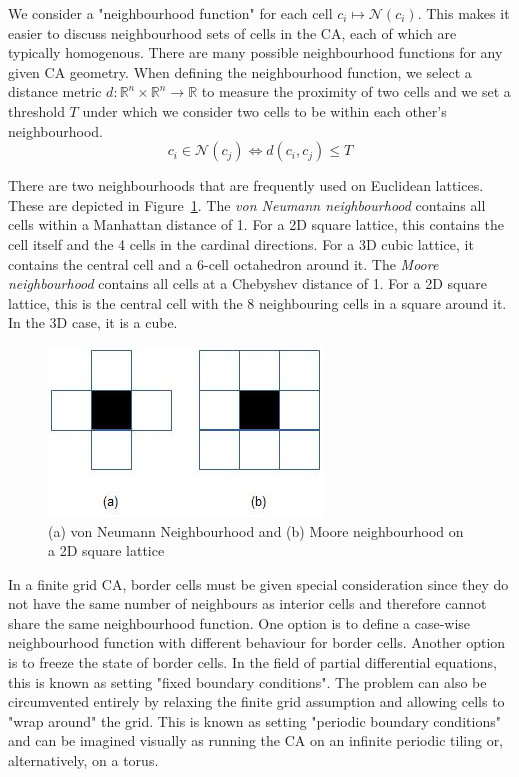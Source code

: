 We consider a "neighbourhood function" for each cell $c_i \mapsto \mathcal{N}(c_i)$. This makes it easier to discuss neighbourhood sets of cells in the CA, each of which are typically homogenous. There are many possible neighbourhood functions for any given CA geometry. When defining the neighbourhood function, we select a distance metric $d:\mathbb{R}^n \times \mathbb{R}^n \to \mathbb{R}$ to measure the proximity of two cells and we set a threshold $T$ under which we consider two cells to be within each other's neighbourhood.
\begin{equation}
  c_i \in \mathcal{N}(c_j) \iff d(c_i, c_j) \leq T
\end{equation}

There are two neighbourhoods that are frequently used on Euclidean lattices. These are depicted in Figure~\ref{fig:neighbourhoods}. The \textit{von Neumann neighbourhood} contains all cells within a Manhattan distance of 1. For a 2D square lattice, this contains the cell itself and the 4 cells in the cardinal directions. For a 3D cubic lattice, it contains the central cell and a 6-cell octahedron around it. The \textit{Moore neighbourhood} contains all cells at a Chebyshev distance of 1. For a 2D square lattice, this is the central cell with the 8 neighbouring cells in a square around it. In the 3D case, it is a cube.\\

\begin{figure}[!h]
\centering
\includegraphics[width=.3\textwidth]{images/neighbourhoods.png}
\caption{(a) von Neumann Neighbourhood and (b) Moore neighbourhood on a 2D square lattice \cite{debasis2011survey}}
\label{fig:neighbourhoods}
\end{figure}

In a finite grid CA, border cells must be given special consideration since they do not have the same number of neighbours as interior cells and therefore cannot share the same neighbourhood function. One option is to define a case-wise neighbourhood function with different behaviour for border cells. Another option is to freeze the state of border cells. In the field of partial differential equations, this is known as setting "fixed boundary conditions".  The problem can also be circumvented entirely by relaxing the finite grid assumption and allowing cells to "wrap around" the grid. This is known as setting "periodic boundary conditions" and can be imagined visually as running the CA on an infinite periodic tiling or, alternatively, on a torus.\\


